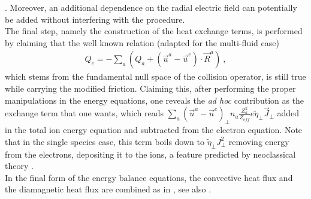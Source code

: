 \documentclass[a4paper,10pt]{report}
\begin{document}
\cite{ROGNLIEN98A}. Moreover, an additional dependence on the radial
electric field can potentially be added without interfering with
the procedure. \\
The final step, namely the construction of the heat exchange terms, is
performed by claiming that the well known relation \cite{BAELMANS94A}
(adapted for the multi-fluid case)
\begin{gather}
Q_e=-\sum_{a} \left (Q_a + (\vec{u}^a - \vec{u}^e) \cdot \vec{R}^a \right )~,
\end{gather}
which stems from the fundamental null space of the collision operator,
is still true while carrying the modified friction.
Claiming this, after
performing the proper manipulations in the energy
equations, one reveals the {\itshape ad hoc}
contribution as the exchange term that one wants,
which reads
$
\sum_{a} (\vec{u}^a -\vec{u}^e)_\perp n_a \frac{Z_a^2}{Z_{eff}}e \tilde{\eta}_\perp \vec{J}_\perp
$
added in the total ion energy equation and subtracted from the
electron equation.
Note that in the single species case, this term boils down to
$
\tilde{\eta}_\perp J_\perp ^2
$
removing energy from the electrons,  depositing it to the ions, a feature
predicted by neoclassical theory \cite{ROSENBLUTH72A}.\\

In the final form of the energy balance equations, the convective heat
flux and the diamagnetic heat flux are combined as in
\cite{ROGNLIEN98A, ROGNLIEN98B, ROGNLIEN99A, HINTON94C}, see also
\cite{ROZ99A}.
\end{document}

